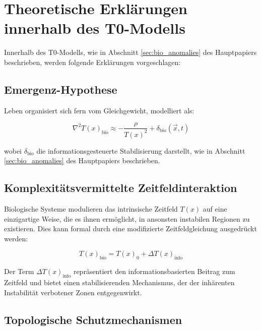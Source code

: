 \documentclass[12pt,a4paper]{article}
\newcommand{\Tfield}{T(x)}
\begin{document}
	\section{Theoretische Erklärungen innerhalb des T0-Modells}
	\label{sec:theoretical_explanations}
	
	Innerhalb des T0-Modells, wie in Abschnitt \ref{sec:bio_anomalies} des Hauptpapiers beschrieben, werden folgende Erklärungen vorgeschlagen:
	
	\subsection{Emergenz-Hypothese}
	\label{subsec:emergence_hypothesis}
	
	Leben organisiert sich fern vom Gleichgewicht, modelliert als:
	
	\begin{equation}
		\nabla^2\Tfield_{\text{bio}} \approx -\frac{\rho}{\Tfield^2} + \delta_{\text{bio}}(\vec{x}, t)
	\end{equation}
	
	wobei \(\delta_{\text{bio}}\) die informationsgesteuerte Stabilisierung darstellt, wie in Abschnitt \ref{sec:bio_anomalies} des Hauptpapiers beschrieben.
	
	\subsection{Komplexitätsvermittelte Zeitfeldinteraktion}
	\label{subsec:complexity_interaction}
	
	Biologische Systeme modulieren das intrinsische Zeitfeld \(\Tfield\) auf eine einzigartige Weise, die es ihnen ermöglicht, in ansonsten instabilen Regionen zu existieren. Dies kann formal durch eine modifizierte Zeitfeldgleichung ausgedrückt werden:
	
	\begin{equation}
		\Tfield_{\text{bio}} = \Tfield_0 + \Delta\Tfield_{\text{info}}
	\end{equation}
	
	Der Term \(\Delta\Tfield_{\text{info}}\) repräsentiert den informationsbasierten Beitrag zum Zeitfeld und bietet einen stabilisierenden Mechanismus, der der inhärenten Instabilität verbotener Zonen entgegenwirkt.
	
	\subsection{Topologische Schutzmechanismen}
	\label{subsec:topological_protection}
	
\end{document}
